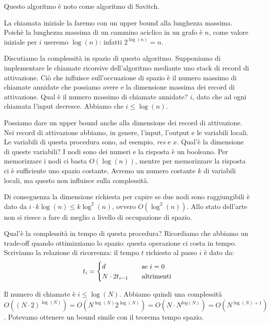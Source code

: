 Questo algoritmo è noto come algoritmo di Savitch.

La chiamata iniziale la faremo con un upper bound alla lunghezza massima. Poichè la lunghezza
massima di un cammino aciclico in un grafo è $n$, come valore iniziale per $i$ useremo $\log(n)$:
infatti $2^{\log(n)} = n$.

Discutiamo la complessità in spazio di questo algoritmo. Supponiamo di implementare le chiamate
ricorsive dell'algoritmo mediante uno stack di record di attivazione. Ciò che influisce
sull'occuazione di spazio è il numero massimo di chiamate annidate che possiamo avere e la
dimensione massima dei record di attivazione. Qual è il numero massimo di chiamate annidate? $i$,
dato che ad ogni chiamata l'input decresce. Abbiamo che $i \leq \log(n)$.

Possiamo dare un upper bound anche alla dimensione dei record di attivazione. Nei record di
attivazione abbiamo, in genere, l'input, l'output e le variabili locali. Le variabili di questa
procedura sono, ad esempio, \textit{res} e $x$. Qual'è la dimensione di queste variabili? I nodi
sono dei numeri e la risposta è un booleano. Per memorizzare i nodi ci basta $O(\log(n))$, mentre
per memorizzare la risposta ci è sufficiente uno spazio costante. Avremo un numero costante $k$ di
variabili locali, ma questo non influisce sulla complessità.

Di conseguenza la dimensione richiesta per capire se due nodi sono raggiungibili è dato da $i\cdot
k\log(n) \leq k\log^{2}(n)$, ovvero $O(\log^{2}(n))$. Allo stato dell'arte non si riesce a fare di
meglio a livello di occupazione di spazio.

Qual'è la complessità in tempo di questa procedura? Ricordiamo che abbiamo un trade-off quando
ottimizziamo lo spazio: questa operazione ci costa in tempo. Scriviamo la relazione di ricorrenza:
il tempo $t$ richiesto al passo $i$ è dato da:
\begin{equation*}
    t_{i} =
    \begin{cases}
        d \quad &\text{se $i = 0$}\\
        N\cdot 2t_{i-1} \quad &\text{altrimenti}\\
    \end{cases}
\end{equation*}

Il numero di chiamate è $i \leq \log(N)$. Abbiamo quindi una complessità $O((N\cdot 2)^{\log(N)})
= O(N^{\log(N)}2^{\log(N)}) = O(N\cdot N^{log(N)}) = O(N^{\log(N)+1})$. Potevamo ottenere un bound
simile con il teorema tempo spazio.

